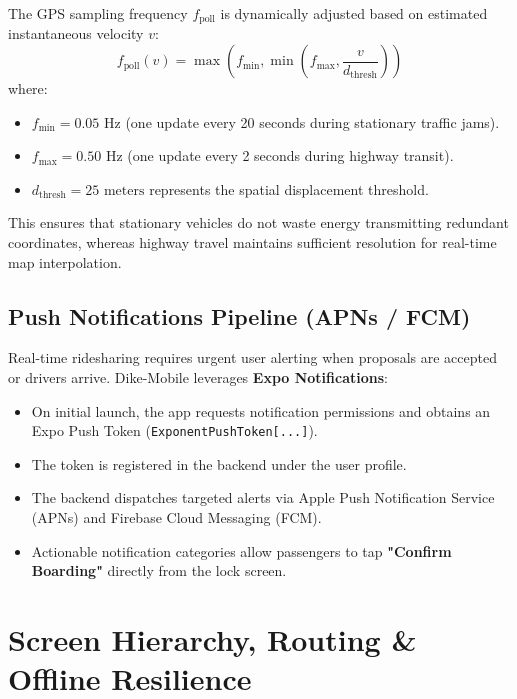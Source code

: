 \documentclass[conference,10pt,a4paper]{IEEEtran}
\begin{document}
The GPS sampling frequency $f_{\text{poll}}$ is dynamically adjusted based on estimated instantaneous velocity $v$:
\begin{equation}
f_{\text{poll}}(v) = \max\left( f_{\text{min}}, \min\left( f_{\text{max}}, \frac{v}{d_{\text{thresh}}} \right) \right)
\end{equation}
where:
\begin{itemize}
    \item $f_{\text{min}} = 0.05\text{ Hz}$ (one update every 20 seconds during stationary traffic jams).
    \item $f_{\text{max}} = 0.50\text{ Hz}$ (one update every 2 seconds during highway transit).
    \item $d_{\text{thresh}} = 25\text{ meters}$ represents the spatial displacement threshold.
\end{itemize}

This ensures that stationary vehicles do not waste energy transmitting redundant coordinates, whereas highway travel maintains sufficient resolution for real-time map interpolation.

\subsection{Push Notifications Pipeline (APNs / FCM)}
Real-time ridesharing requires urgent user alerting when proposals are accepted or drivers arrive. Dike-Mobile leverages \textbf{Expo Notifications}:
\begin{itemize}
    \item On initial launch, the app requests notification permissions and obtains an Expo Push Token (\texttt{ExponentPushToken[...]}).
    \item The token is registered in the backend under the user profile.
    \item The backend dispatches targeted alerts via Apple Push Notification Service (APNs) and Firebase Cloud Messaging (FCM).
    \item Actionable notification categories allow passengers to tap \textbf{"Confirm Boarding"} directly from the lock screen.
\end{itemize}

\section{Screen Hierarchy, Routing \& Offline Resilience}
\end{document}
